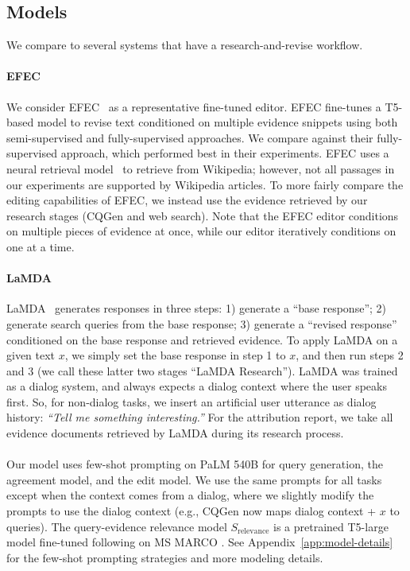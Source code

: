 \subsection{Models}\label{sec:baselines}
We compare \approach{} to several systems that have a research-and-revise workflow.

\paragraph{EFEC}
We consider EFEC~\cite{thorne2021evidence} as a representative fine-tuned editor.
EFEC fine-tunes a T5-based model to revise text conditioned on multiple evidence snippets using both semi-supervised and fully-supervised approaches.
We compare against their fully-supervised approach, which performed best in their experiments.
EFEC uses a neural retrieval model~\cite{karpukhin2020dpr} to retrieve from Wikipedia; however, not all passages in our experiments are supported by Wikipedia articles.
To more fairly compare the editing capabilities of EFEC, we instead use the evidence retrieved by our research stages (CQGen and web search). %
Note that the EFEC editor conditions on multiple pieces of evidence at once, while our editor iteratively conditions on one at a time.


\paragraph{LaMDA}
LaMDA~\cite{Thoppilan2022LaMDA} generates responses in three steps: 
1) generate a ``base response'';
2) generate search queries from the base response;
3) generate a ``revised response'' conditioned on the base response and retrieved evidence.
To apply LaMDA on a given text $x$, we simply set the base response in step 1 to $x$, and then run steps 2 and 3 (we call these latter two stages ``LaMDA Research'').
LaMDA was trained as a dialog system, and always expects a dialog context where the user speaks first.
So, for non-dialog tasks, we insert an artificial user utterance as dialog history: \emph{``Tell me something interesting.''}
For the attribution report, we take all evidence documents retrieved by LaMDA during its research process.

\paragraph{\approach{}}
Our model uses few-shot prompting on PaLM 540B for query generation, the agreement model, and the edit model.
We use the same prompts for all tasks except when the context comes from a dialog,
    where we slightly modify the prompts to use the dialog context (e.g., CQGen now maps dialog context + $x$ to queries).
The query-evidence relevance model $S_\text{relevance}$ is a pretrained T5-large model \cite{raffel20t5} fine-tuned following \citet{ni2021gtr} on MS MARCO \cite{nguyen2016msmarco}.
See Appendix~\ref{app:model-details} for the few-shot prompting strategies and more modeling details.

